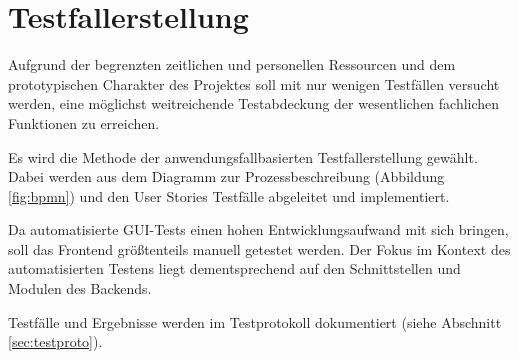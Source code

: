 \documentclass[a4paper,11pt,listof=numbered,glossary=totoc,parskip=half,toc=bib]{scrreprt}
\begin{document}
\section{Testfallerstellung}
	Aufgrund der begrenzten zeitlichen und personellen Ressourcen und dem prototypischen Charakter des Projektes soll mit nur wenigen Testfällen versucht werden, eine möglichst weitreichende Testabdeckung der wesentlichen fachlichen Funktionen zu erreichen.
	
	Es wird die Methode der anwendungsfallbasierten Testfallerstellung gewählt. Dabei werden aus dem Diagramm zur Prozessbeschreibung (Abbildung \ref{fig:bpmn}) und den User Stories Testfälle abgeleitet und implementiert. 
	
	Da automatisierte GUI-Tests einen hohen Entwicklungsaufwand mit sich bringen, soll das Frontend größtenteils manuell getestet werden. Der Fokus im Kontext des automatisierten Testens liegt dementsprechend auf den Schnittstellen und Modulen des Backends. 
	
	Testfälle und Ergebnisse werden im Testprotokoll dokumentiert (siehe Abschnitt \ref{sec:testproto}).
	
	\printglossaries
	\newpage	
	\printbibliography[heading=bibnumbered,title=Literaturverzeichnis]
\end{document}
